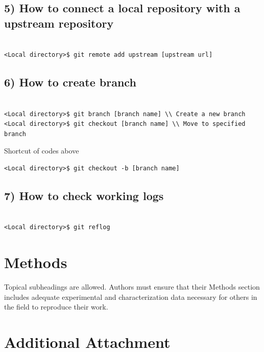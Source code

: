 \documentclass[fleqn,10pt]{wlscirep}
\begin{document}
\subsection*{5) How to connect a local repository with a upstream repository}
\begin{verbatim}

<Local directory>$ git remote add upstream [upstream url]

\end{verbatim}


\subsection*{6) How to create branch}
\begin{verbatim}

<Local directory>$ git branch [branch name] \\ Create a new branch
<Local directory>$ git checkout [branch name] \\ Move to specified branch

\end{verbatim}
Shortcut of codes above
\begin{verbatim}
<Local directory>$ git checkout -b [branch name]

\end{verbatim}


\subsection*{7) How to check working logs}
\begin{verbatim}

<Local directory>$ git reflog

\end{verbatim}

\section*{Methods}

Topical subheadings are allowed. Authors must ensure that their Methods section includes adequate experimental and characterization data necessary for others in the field to reproduce their work.



\section*{Additional Attachment}
\end{document}
